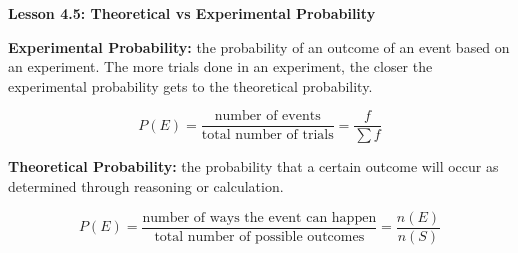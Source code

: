  \begin{center}
\textbf{Lesson 4.5: Theoretical vs Experimental Probability}
\end{center}

\vspace*{-1.5ex}

\textbf{Experimental Probability:} the probability of an outcome of an event based on an experiment. The more trials done in an experiment, the closer the experimental probability gets to the theoretical probability.

\vspace*{-1ex}\[P(E) = \displaystyle \frac{\text{number of events}}{\text{total number of trials}} = \dfrac{f}{\sum f}\]

\textbf{Theoretical Probability:} the probability that a certain outcome will occur as determined through reasoning or calculation.

\vspace*{-1ex}\[P(E) = \displaystyle \frac{\text{number of ways the event can happen}}{\text{total number of possible outcomes}} = \dfrac{n(E)}{n(S)}\] 
